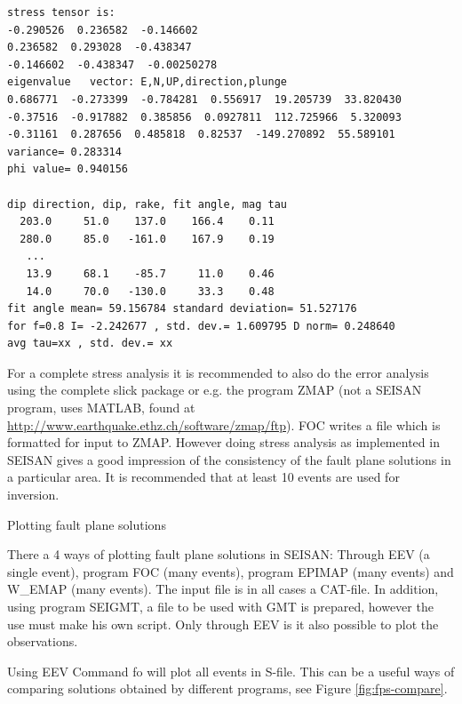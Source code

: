 \begin{verbatim}
stress tensor is:
-0.290526  0.236582  -0.146602  
0.236582  0.293028  -0.438347  
-0.146602  -0.438347  -0.00250278  
eigenvalue   vector: E,N,UP,direction,plunge
0.686771  -0.273399  -0.784281  0.556917  19.205739  33.820430
-0.37516  -0.917882  0.385856  0.0927811  112.725966  5.320093
-0.31161  0.287656  0.485818  0.82537  -149.270892  55.589101
variance= 0.283314
phi value= 0.940156

dip direction, dip, rake, fit angle, mag tau
  203.0     51.0    137.0    166.4    0.11
  280.0     85.0   -161.0    167.9    0.19
   ...
   13.9     68.1    -85.7     11.0    0.46
   14.0     70.0   -130.0     33.3    0.48
fit angle mean= 59.156784 standard deviation= 51.527176
for f=0.8 I= -2.242677 , std. dev.= 1.609795 D norm= 0.248640
avg tau=xx , std. dev.= xx
\end{verbatim}


For a complete stress analysis it is recommended to also do the error analysis using the complete slick package or e.g. the program ZMAP (not a SEISAN program, uses MATLAB, found at 
\url{http://www.earthquake.ethz.ch/software/zmap/ftp}).  
FOC writes a file which is formatted for input to ZMAP. However doing stress analysis as implemented in SEISAN gives a good impression of the consistency of the fault plane solutions in a particular area. It is recommended that at least 10 events are used for inversion.
 

Plotting fault plane solutions

There a 4 ways of plotting fault plane solutions in SEISAN:  Through EEV (a single event), program FOC (many events), program EPIMAP (many events) and W\_EMAP (many events). The input file is in all cases a CAT-file. In addition, using program SEIGMT, a file to be used with GMT is prepared, however the use must make his own script. Only through EEV is it also possible to plot the observations.

Using EEV\newline
Command fo will plot all events in S-file. This can be a useful ways of comparing solutions obtained by different programs, see Figure \ref{fig:fps-compare}.

 

